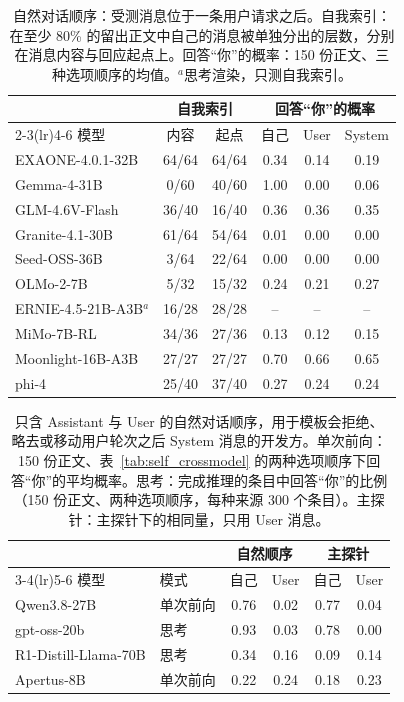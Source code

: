\begin{table}[htbp]
\centering
\caption{自然对话顺序：受测消息位于一条用户请求之后。自我索引：在至少 80\% 的留出正文中自己的消息被单独分出的层数，分别在消息内容与回应起点上。回答“你”的概率：150 份正文、三种选项顺序的均值。$^{a}$思考渲染，只测自我索引。}
\label{tab:self_natural}
\footnotesize
\begin{tabular}{lccccc}
\toprule
& \multicolumn{2}{c}{自我索引} & \multicolumn{3}{c}{回答“你”的概率} \\
\cmidrule(lr){2-3}\cmidrule(lr){4-6}
模型 & 内容 & 起点 & 自己 & User & System \\
\midrule
EXAONE-4.0.1-32B & 64/64 & 64/64 & 0.34 & 0.14 & 0.19 \\
Gemma-4-31B & 0/60 & 40/60 & 1.00 & 0.00 & 0.06 \\
GLM-4.6V-Flash & 36/40 & 16/40 & 0.36 & 0.36 & 0.35 \\
Granite-4.1-30B & 61/64 & 54/64 & 0.01 & 0.00 & 0.00 \\
Seed-OSS-36B & 3/64 & 22/64 & 0.00 & 0.00 & 0.00 \\
OLMo-2-7B & 5/32 & 15/32 & 0.24 & 0.21 & 0.27 \\
ERNIE-4.5-21B-A3B$^{a}$ & 16/28 & 28/28 & -- & -- & -- \\
MiMo-7B-RL & 34/36 & 27/36 & 0.13 & 0.12 & 0.15 \\
Moonlight-16B-A3B & 27/27 & 27/27 & 0.70 & 0.66 & 0.65 \\
phi-4 & 25/40 & 37/40 & 0.27 & 0.24 & 0.24 \\
\bottomrule
\end{tabular}
\end{table}

\begin{table}[htbp]
\centering
\caption{只含 Assistant 与 User 的自然对话顺序，用于模板会拒绝、略去或移动用户轮次之后 System 消息的开发方。单次前向：150 份正文、表~\ref{tab:self_crossmodel} 的两种选项顺序下回答“你”的平均概率。思考：完成推理的条目中回答“你”的比例（150 份正文、两种选项顺序，每种来源 300 个条目）。主探针：主探针下的相同量，只用 User 消息。}
\label{tab:self_natural2}
\footnotesize
\begin{tabular}{llcccc}
\toprule
& & \multicolumn{2}{c}{自然顺序} & \multicolumn{2}{c}{主探针} \\
\cmidrule(lr){3-4}\cmidrule(lr){5-6}
模型 & 模式 & 自己 & User & 自己 & User \\
\midrule
Qwen3.8-27B & 单次前向 & 0.76 & 0.02 & 0.77 & 0.04 \\
gpt-oss-20b & 思考 & 0.93 & 0.03 & 0.78 & 0.00 \\
R1-Distill-Llama-70B & 思考 & 0.34 & 0.16 & 0.09 & 0.14 \\
Apertus-8B & 单次前向 & 0.22 & 0.24 & 0.18 & 0.23 \\
\bottomrule
\end{tabular}
\end{table}

